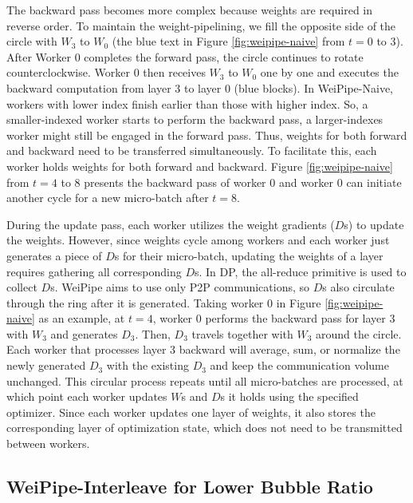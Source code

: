 \documentclass[sigplan,review]{acmart}
\begin{document}
The backward pass becomes more complex because weights are required in reverse order. To maintain the weight-pipelining, we fill the opposite side of the circle with $W_3$ to $W_0$ (the blue text in Figure \ref{fig:weipipe-naive} from $t=0$ to $3$). After Worker 0 completes the forward pass, the circle continues to rotate counterclockwise. Worker 0 then receives $W_3$ to $W_0$ one by one and executes the backward computation from layer 3 to layer 0 (blue blocks). In WeiPipe-Naive, workers with lower index finish earlier than those with higher index. So, a smaller-indexed worker starts to perform the backward pass, a larger-indexes worker might still be engaged in the forward pass. Thus, weights for both forward and backward need to be transferred simultaneously. To facilitate this, each worker holds weights for both forward and backward. Figure \ref{fig:weipipe-naive} from $t=4$ to $8$ presents the backward pass of worker 0 and worker 0 can initiate another cycle for a new micro-batch after $t=8$. 

During the update pass, each worker utilizes the weight gradients ($D$s) to update the weights. However, since weights cycle among workers and each worker just generates a piece of $D$s for their micro-batch, updating the weights of a layer requires gathering all corresponding $D$s. In DP, the all-reduce primitive is used to collect $D$s. WeiPipe aims to use only P2P communications, so $D$s also circulate through the ring after it is generated. Taking worker 0 in Figure \ref{fig:weipipe-naive} as an example, at $t=4$, worker 0 performs the backward pass for layer 3 with $W_3$ and generates $D_3$. Then, $D_3$ travels together with $W_3$ around the circle. Each worker that processes layer 3 backward will average, sum, or normalize the newly generated $D_3$ with the existing $D_3$ and keep the communication volume unchanged. This circular process repeats until all micro-batches are processed, at which point each worker updates $W$s and $D$s it holds using the specified optimizer. Since each worker updates one layer of weights, it also stores the corresponding layer of optimization state, which does not need to be transmitted between workers.


\subsection{WeiPipe-Interleave for Lower Bubble Ratio}  
\end{document}
